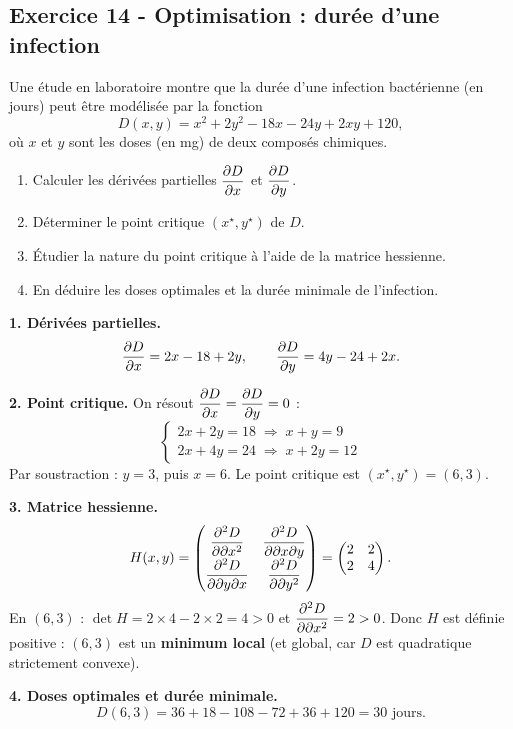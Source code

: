 \documentclass[12pt,a4paper]{article}
\begin{document}
\subsection*{Exercice 14 - Optimisation : durée d'une infection \niveau{\difficile}}

\begin{boiteexercice}
Une étude en laboratoire montre que la durée d'une infection bactérienne (en jours) peut être modélisée par la fonction
\[
D(x, y) = x^2 + 2y^2 - 18x - 24y + 2xy + 120,
\]
où $x$ et $y$ sont les doses (en mg) de deux composés chimiques.
\begin{enumerate}
  \item Calculer les dérivées partielles $\dfrac{\partial D}{\partial x}$ et $\dfrac{\partial D}{\partial y}$.
  \item Déterminer le point critique $(x^\star, y^\star)$ de $D$.
  \item Étudier la nature du point critique à l'aide de la matrice hessienne.
  \item En déduire les doses optimales et la durée minimale de l'infection.
\end{enumerate}
\end{boiteexercice}

\begin{boitecorrige}
\textbf{1. Dérivées partielles.}
\[
\dfrac{\partial D}{\partial x} = 2x - 18 + 2y, \qquad \dfrac{\partial D}{\partial y} = 4y - 24 + 2x.
\]

\textbf{2. Point critique.} On résout $\dfrac{\partial D}{\partial x} = \dfrac{\partial D}{\partial y} = 0$ :
\[
\begin{cases}
2x + 2y = 18 \;\Rightarrow\; x + y = 9\\
2x + 4y = 24 \;\Rightarrow\; x + 2y = 12
\end{cases}
\]
Par soustraction : $y = 3$, puis $x = 6$. Le point critique est $(x^\star, y^\star) = (6, 3)$.

\textbf{3. Matrice hessienne.}
\[
H(x,y) = \begin{pmatrix} \dfrac{\partial ^2 D}{\partial \partial x^2} & \dfrac{\partial ^2 D}{\partial \partial x\partial y}\\[4pt] \dfrac{\partial ^2 D}{\partial \partial y\partial x} & \dfrac{\partial ^2 D}{\partial \partial y^2}\end{pmatrix} = \begin{pmatrix} 2 & 2 \\ 2 & 4 \end{pmatrix}.
\]
En $(6,3)$ : $\det H = 2\times 4 - 2\times 2 = 4 > 0$ et $\dfrac{\partial ^2 D}{\partial \partial x^2} = 2 > 0$. Donc $H$ est définie positive : $(6,3)$ est un \textbf{minimum local} (et global, car $D$ est quadratique strictement convexe).

\textbf{4. Doses optimales et durée minimale.}
\[
D(6,3) = 36 + 18 - 108 - 72 + 36 + 120 = 30 \text{ jours.}
\]

\end{boitecorrige}

\ifdefined\inMainDoc\else
\end{document}
